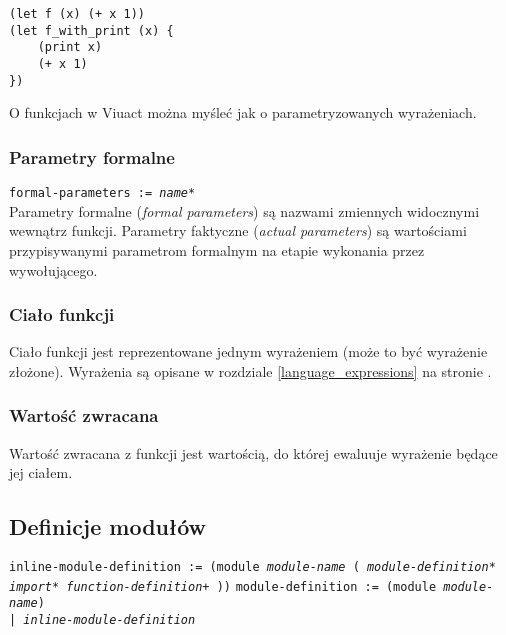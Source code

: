 \begin{lstlisting}
(let f (x) (+ x 1))
(let f_with_print (x) {
    (print x)
    (+ x 1)
})
\end{lstlisting}

O funkcjach w Viuact można myśleć jak o parametryzowanych wyrażeniach.

\subsubsection{Parametry formalne}

\texttt{formal-parameters := \emph{name}*}
\\

Parametry formalne (\emph{formal parameters}) są nazwami zmiennych widocznymi wewnątrz funkcji.
Parametry faktyczne (\emph{actual parameters}) są wartościami przypisywanymi parametrom formalnym na etapie
wykonania przez wywołującego.

\subsubsection{Ciało funkcji}

Ciało funkcji jest reprezentowane jednym wyrażeniem (może to być wyrażenie złożone).
Wyrażenia są opisane w rozdziale
\ref{language_expressions} na stronie \pageref{language_expressions}.

\subsubsection{Wartość zwracana}

Wartość zwracana z funkcji jest wartością, do której ewaluuje wyrażenie będące jej ciałem.

\subsection{Definicje modułów}

\texttt{inline-module-definition := (module \emph{module-name} (
\newline
\phantom{inline-module-definition := ~ }\emph{module-definition}*
\newline
\phantom{inline-module-definition := ~ }\emph{import}*
\newline
\phantom{inline-module-definition := ~ }\emph{function-definition}+
))}
\newline
\texttt{module-definition := (module \emph{module-name}) \\
\phantom{module-definition :}| \emph{inline-module-definition}}
\newline

